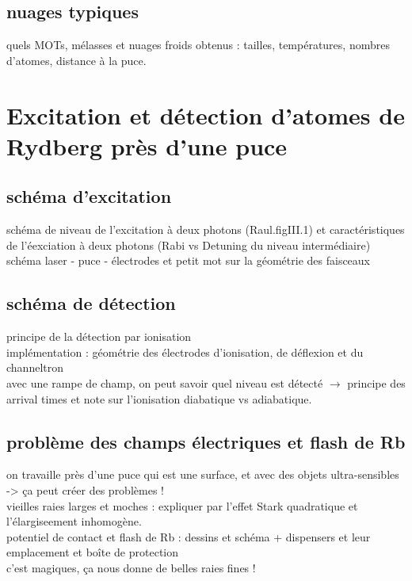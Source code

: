 	\subsection{nuages typiques}
		\noindent quels MOTs, mélasses et nuages froids obtenus : tailles, températures, nombres d'atomes, distance à la puce.

\section{Excitation et détection d'atomes de Rydberg près d'une puce}

	\subsection{schéma d'excitation}
		\noindent schéma de niveau de l'excitation à deux photons (Raul.figIII.1) et caractéristiques de l'éexciation à deux photons (Rabi vs Detuning du niveau intermédiaire) \\
		\noindent schéma laser - puce - électrodes et petit mot sur la géométrie des faisceaux
		
		
	\subsection{schéma de détection}
		\noindent principe de la détection par ionisation \\
		\noindent implémentation : géométrie des électrodes d'ionisation, de déflexion et du channeltron \\
		\noindent avec une rampe de champ, on peut savoir quel niveau est détecté $\rightarrow$ principe des arrival times et note sur l'ionisation diabatique vs adiabatique. 
		
	\subsection{problème des champs électriques et flash de Rb}
	on travaille près d'une puce qui est une surface, et avec des objets ultra-sensibles -> ça peut créer des problèmes ! \\
		\noindent vieilles raies larges et moches : expliquer par l'effet Stark quadratique et l'élargiseement inhomogène. \\
		\noindent potentiel de contact et flash de Rb : dessins et schéma + dispensers et leur emplacement et boîte de protection \\
		\noindent c'est magiques, ça nous donne de belles raies fines !
		
